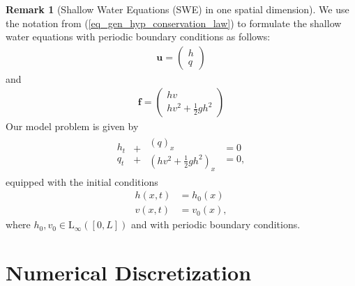 \documentclass[12pt,a4paper]{article}
\numberwithin{equation}{section}
\theoremstyle{definition}
\newcommand{\vect}[1]{\textbf{#1}}
\newcommand{\leb}{\text{L}}
\newcommand{\qp}[1]{\left(#1\right)}
\newcommand{\qb}[1]{\left[#1\right]}
\newtheorem{Rem}[subsection]{Remark}
\begin{document}
\begin{Rem}[Shallow Water Equations (SWE) in one spatial dimension] We use the notation from (\ref{eq_gen_hyp_conservation_law}) to formulate the shallow water equations with periodic boundary conditions as follows:
	\begin{equation}
	\begin{aligned}
	\vect{u}=\qp{\begin{array}{c}
h\\
q
		\end{array}}
	\end{aligned}
	\end{equation}
	and 
	\begin{equation}
\begin{aligned}
\vect{f}=\qp{\begin{array}{c}
	hv\\
	hv^2+\frac{1}{2}gh^2
	\end{array}}
\end{aligned}
	\end{equation}
		 Our model problem is given by
\begin{equation}\label{eq_model_SWE}
\begin{aligned}
\begin{array}{c}
h_t\\
q_t
\end{array}
\begin{array}{c}
+\\
+
\end{array}
\begin{array}{c}
\qp{q}_x\\
\qp{hv^2+\frac{1}{2}gh^2}_x
\end{array}
\begin{array}{c}
=0\\
=0,
\end{array}
\end{aligned}
\end{equation}
equipped with the initial conditions
\begin{equation}
\begin{aligned}
h\qp{x,t}&=h_0\qp{x}\\
v\qp{x,t}&=v_0\qp{x},
\end{aligned}
\end{equation}
where $h_0, v_0\in \leb_\infty\qp{\qb{0,L}}$ and with periodic boundary conditions.
\end{Rem}

\section{Numerical Discretization}\label{sec:num_disc}
\end{document}
